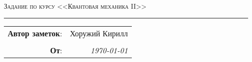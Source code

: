 
\begin{center}
    \LARGE \textsc{Задание по курсу <<Квантовая механика II>>}
\end{center}

\hrule

\phantom{42}

\begin{flushright}
    \begin{tabular}{rr}
        \textbf{Автор заметок}: 
        & Хоружий Кирилл \\
        & \\
        \textbf{От}: &
        \textit{\today}\\
    \end{tabular}
\end{flushright}

\thispagestyle{empty}
